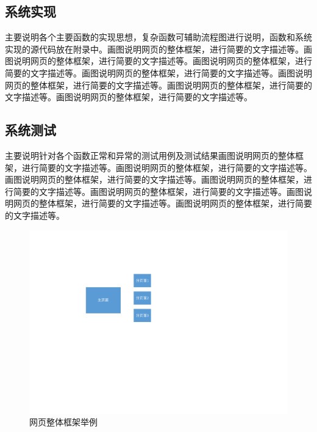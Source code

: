 \documentclass[supercite]{HustGraduPaper}
\theoremstyle{definition}
\begin{document}
    \subsection{系统实现}

    主要说明各个主要函数的实现思想，复杂函数可辅助流程图进行说明，函数和系统实现的源代码放在附录中。画图说明网页的整体框架，进行简要的文字描述等。画图说明网页的整体框架，进行简要的文字描述等。画图说明网页的整体框架，进行简要的文字描述等。画图说明网页的整体框架，进行简要的文字描述等。画图说明网页的整体框架，进行简要的文字描述等。画图说明网页的整体框架，进行简要的文字描述等。画图说明网页的整体框架，进行简要的文字描述等。

    \subsection{系统测试}

    主要说明针对各个函数正常和异常的测试用例及测试结果画图说明网页的整体框架，进行简要的文字描述等。画图说明网页的整体框架，进行简要的文字描述等。画图说明网页的整体框架，进行简要的文字描述等。画图说明网页的整体框架，进行简要的文字描述等。画图说明网页的整体框架，进行简要的文字描述等。画图说明网页的整体框架，进行简要的文字描述等。画图说明网页的整体框架，进行简要的文字描述等。

    \begin{figure}[htb] %
        \begin{center}
            \includegraphics[scale=0.80]{images/1-1.pdf}
            \caption{网页整体框架举例}
            \label{fig4-1}
        \end{center}
    \end{figure}
\end{document}
